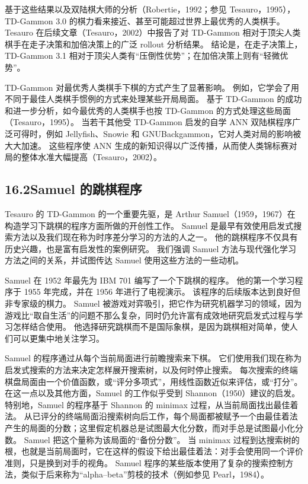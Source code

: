 \documentclass[UTF8,12pt,a4paper,fontset=fandol]{ctexart}
\begin{document}
基于这些结果以及双陆棋大师的分析（Robertie，1992；参见 Tesauro，1995），TD-Gammon 3.0 的棋力看来接近、甚至可能超过世界上最优秀的人类棋手。
Tesauro 在后续文章（Tesauro，2002）中报告了对 TD-Gammon 相对于顶尖人类棋手在走子决策和加倍决策上的广泛 rollout 分析结果。
结论是，在走子决策上，TD-Gammon 3.1 相对于顶尖人类有“压倒性优势”；在加倍决策上则有“轻微优势”。

TD-Gammon 对最优秀人类棋手下棋的方式产生了显著影响。
例如，它学会了用不同于最佳人类棋手惯例的方式来处理某些开局局面。
基于 TD-Gammon 的成功和进一步分析，如今最优秀的人类棋手也按 TD-Gammon 的方式处理这些局面（Tesauro，1995）。
当若干其他受 TD-Gammon 启发的自学 ANN 双陆棋程序广泛可得时，例如 Jellyfish、Snowie 和 GNUBackgammon，它对人类对局的影响被大大加速。
这些程序使 ANN 生成的新知识得以广泛传播，从而使人类锦标赛对局的整体水准大幅提高（Tesauro，2002）。

\subsection*{16.2\quad Samuel 的跳棋程序}

Tesauro 的 TD-Gammon 的一个重要先驱，是 Arthur Samuel（1959，1967）在构造学习下跳棋的程序方面所做的开创性工作。
Samuel 是最早有效使用启发式搜索方法以及我们现在称为时序差分学习的方法的人之一。
他的跳棋程序不仅具有历史兴趣，也是富有启发性的案例研究。
我们强调 Samuel 方法与现代强化学习方法之间的关系，并试图传达 Samuel 使用这些方法的一些动机。

Samuel 在 1952 年最先为 IBM 701 编写了一个下跳棋的程序。
他的第一个学习程序于 1955 年完成，并在 1956 年进行了电视演示。
该程序的后续版本达到良好但非专家级的棋力。
Samuel 被游戏对弈吸引，把它作为研究机器学习的领域，因为游戏比“取自生活”的问题不那么复杂，同时仍允许富有成效地研究启发式过程与学习怎样结合使用。
他选择研究跳棋而不是国际象棋，是因为跳棋相对简单，使人们可以更集中地关注学习。

Samuel 的程序通过从每个当前局面进行前瞻搜索来下棋。
它们使用我们现在称为启发式搜索的方法来决定怎样展开搜索树，以及何时停止搜索。
每次搜索的终端棋盘局面由一个价值函数，或“评分多项式”，用线性函数近似来评估，或“打分”。
在这一点以及其他方面，Samuel 的工作似乎受到 Shannon（1950）建议的启发。
特别地，Samuel 的程序基于 Shannon 的 minimax 过程，从当前局面找出最佳着法。
从已评分的终端局面沿搜索树向后工作，每个局面都被赋予一个由最佳着法产生的局面的分数；这里假定机器总是试图最大化分数，而对手总是试图最小化分数。
Samuel 把这个量称为该局面的“备份分数”。
当 minimax 过程到达搜索树的根，也就是当前局面时，它在这样的假设下给出最佳着法：对手会使用同一个评价准则，只是换到对手的视角。
Samuel 程序的某些版本使用了复杂的搜索控制方法，类似于后来称为“alpha--beta”剪枝的技术（例如参见 Pearl，1984）。
\end{document}
